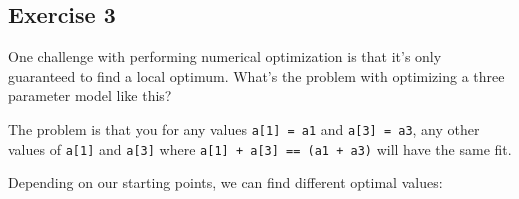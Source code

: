 \documentclass[]{book}
\newenvironment{Shaded}{\begin{snugshade}}{\end{snugshade}}
\newcommand{\CommentTok}[1]{\textcolor[rgb]{0.56,0.35,0.01}{\textit{#1}}}
\newcommand{\ControlFlowTok}[1]{\textcolor[rgb]{0.13,0.29,0.53}{\textbf{#1}}}
\newcommand{\DataTypeTok}[1]{\textcolor[rgb]{0.13,0.29,0.53}{#1}}
\newcommand{\DecValTok}[1]{\textcolor[rgb]{0.00,0.00,0.81}{#1}}
\newcommand{\KeywordTok}[1]{\textcolor[rgb]{0.13,0.29,0.53}{\textbf{#1}}}
\newcommand{\NormalTok}[1]{#1}
\newcommand{\OperatorTok}[1]{\textcolor[rgb]{0.81,0.36,0.00}{\textbf{#1}}}
\newcommand{\StringTok}[1]{\textcolor[rgb]{0.31,0.60,0.02}{#1}}
\theoremstyle{definition}
\theoremstyle{definition}
\theoremstyle{definition}
\theoremstyle{remark}
\begin{document}
\hypertarget{exercise-3-42}{%
\subsection{Exercise 3}\label{exercise-3-42}}

One challenge with performing numerical optimization is that it's only
guaranteed to find a local optimum. What's the problem with optimizing a
three parameter model like this?

\begin{Shaded}
\end{Shaded}

The problem is that you for any values \texttt{a{[}1{]}\ =\ a1} and
\texttt{a{[}3{]}\ =\ a3}, any other values of \texttt{a{[}1{]}} and
\texttt{a{[}3{]}} where \texttt{a{[}1{]}\ +\ a{[}3{]}\ ==\ (a1\ +\ a3)}
will have the same fit.

\begin{Shaded}
\end{Shaded}

Depending on our starting points, we can find different optimal values:

\begin{Shaded}
\end{Shaded}
\end{document}
